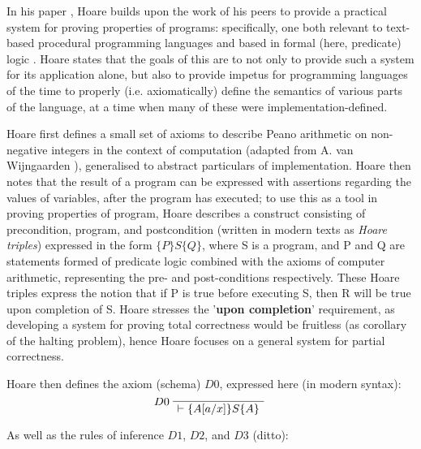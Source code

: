 \documentclass[11pt]{article}
\newenvironment{bprooftree}
  {\leavevmode\hbox\bgroup}
  {\DisplayProof\egroup}
\begin{document}
In his paper \cite{hoare1969axiomatic}, Hoare builds upon the work of his peers
to provide a practical system for proving properties of programs: specifically,
one both relevant to text-based procedural programming languages
\cite{naur1966proof} and based in formal (here, predicate) logic
\cite{floyd1967assigning}. Hoare states that the goals of this are to not only
to provide such a system for its application alone, but also to provide impetus
for programming languages of the time to properly (i.e. axiomatically) define
the semantics of various parts of the language, at a time when many of these
were implementation-defined. 
\par
Hoare first defines a small set of axioms to describe Peano arithmetic on
non-negative integers in the context of computation (adapted from A. van
Wijngaarden \cite{van1966numerical}), generalised to abstract particulars of
implementation. Hoare then notes that the result of a program can be expressed
with assertions regarding the values of variables, after the program has
executed; to use this as a tool in proving properties of program, Hoare
describes a construct consisting of precondition, program, and postcondition 
(written in modern texts as \textit{Hoare triples}) expressed in the form $
\{P\} S \{Q\} $, where S is a program, and P and Q are statements formed of
predicate logic combined with the axioms of computer arithmetic, representing
the pre- and post-conditions respectively. These Hoare triples express the
notion that if P is true before executing S, then R will be true upon completion
of S. Hoare stresses the '\textbf{upon completion}' requirement, as developing a
system for proving total correctness would be fruitless (as corollary of the
halting problem), hence Hoare focuses on a general system for partial
correctness.
\par
Hoare then defines the axiom (schema) $D0$, expressed here (in modern syntax):
\[
    \begin{bprooftree}
        \LeftLabel{$D0$}
        \AxiomC{}
        \UnaryInfC{$ \vdash \{A[a/x]\} S \{A\} $}
    \end{bprooftree} 
\]

As well as the rules of inference $D1$, $D2$, and $D3$ (ditto): 
\end{document}
